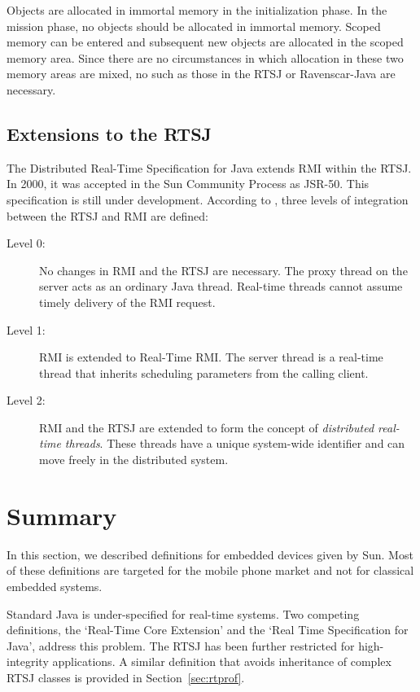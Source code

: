 Objects are allocated in immortal memory in the initialization
phase. In the mission phase, no objects should be allocated in
immortal memory. Scoped memory can be entered and subsequent new
objects are allocated in the scoped memory area. Since there are no
circumstances in which allocation in these two memory areas are
mixed, no  such as those in the RTSJ or
Ravenscar-Java are necessary.

\subsection{Extensions to the RTSJ}

The Distributed Real-Time Specification for Java \cite{Jensen00}
extends RMI within the RTSJ. In 2000, it was accepted in the Sun
Community Process as JSR-50. This specification is still under
development. According to \cite{WellRTSJRMI}, three levels of
integration between the RTSJ and RMI are defined:
%
\begin{description}
    \item[Level 0:] No changes in RMI and the RTSJ are necessary. The proxy thread
on the server acts as an ordinary Java thread. Real-time threads
cannot assume timely delivery of the RMI request.

    \item[Level 1:] RMI is extended to Real-Time RMI. The server
thread is a real-time thread that inherits scheduling parameters
from the calling client.

    \item[Level 2:] RMI and the RTSJ are extended to form the
concept of \textit{distributed real-time threads}. These threads
have a unique system-wide identifier and can move freely in the
distributed system.

\end{description}

\section{Summary}

In this section, we described definitions for embedded devices given
by Sun. Most of these definitions are targeted for the mobile phone
market and not for classical embedded systems.

Standard Java is under-specified for real-time systems. Two
competing definitions, the `Real-Time Core Extension' and the `Real
Time Specification for Java', address this problem. The RTSJ has
been further restricted for high-integrity applications. A similar
definition that avoids inheritance of complex RTSJ classes is
provided in Section~\ref{sec:rtprof}.
